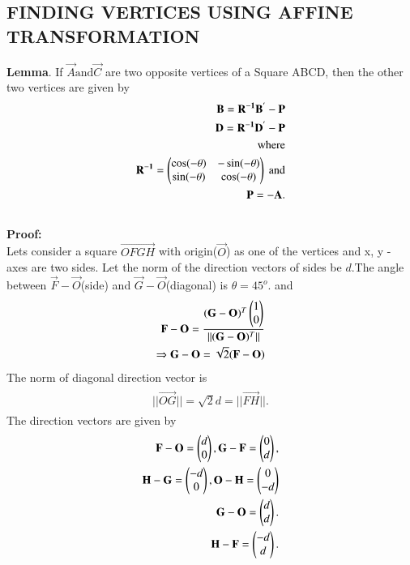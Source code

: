 \documentclass[journal,12pt,twocolumn]{IEEEtran}
\begin{document}
\subsection{FINDING VERTICES USING AFFINE TRANSFORMATION}
\textbf{Lemma}.
If $\vec{A} \text{and} \vec{C}$ are two opposite vertices of a Square ABCD, then the other two vertices are given by
\begin{align}
\begin{split}
\mathbf{B} = \mathbf{R^{-1}B^{'}}-\mathbf{P}\\
\mathbf{D} = \mathbf{R^{-1}D^{'}}-\mathbf{P}\\
\text{where}\\
\mathbf{R^{-1}} = \begin{pmatrix}\cos (-\theta) & -\sin (-\theta) \\ \sin (-\theta) & \cos (-\theta)\end{pmatrix} \ \text{and}\\
\mathbf{P} =  - \mathbf{A}.\\
\end{split}
\end{align}
\\
\textbf{Proof:}
\\
Lets consider a square $\vec{OFGH}$ with origin($\vec{O}$) as one of the vertices and x, y - axes are two sides.  Let the norm of the direction vectors of sides be $d$.The angle between $\vec{F}-\vec{O}$(side) and $\vec{G}-\vec{O}$(diagonal) is  $\theta = 45^{o}$. and
\begin{align}
\begin{split}
\mathbf{F}-\mathbf{O} = \frac{(\mathbf{G}-\mathbf{O})^T\begin{pmatrix}1\\0\end{pmatrix}}{\Vert(\mathbf{G}-\mathbf{O})^T\Vert}\\
\Rightarrow \mathbf{G}-\mathbf{O} = \sqrt{2}(\mathbf{F}-\mathbf{O})\\
\end{split}
\end{align}
The norm of diagonal direction vector is
\begin{align}
\begin{split}
||\vec{OG}||=\sqrt{2}d=||\vec{FH}||.
\end{split}
\end{align}
The direction vectors are given by
\begin{align}
\begin{split}
\mathbf{F}-\mathbf{O}=\begin{pmatrix}d\\0\end{pmatrix},\mathbf{G}-\mathbf{F}=\begin{pmatrix}0\\d\end{pmatrix},\\ \mathbf{H}-\mathbf{G}=\begin{pmatrix}-d\\0\end{pmatrix},\mathbf{O}-\mathbf{H}=\begin{pmatrix}0\\-d\end{pmatrix}\\
\mathbf{G}-\mathbf{O}=\begin{pmatrix}d\\d\end{pmatrix}.\\
\mathbf{H}-\mathbf{F}=\begin{pmatrix}-d\\d\end{pmatrix}.\\
\end{split}
\end{align}
\end{document}
